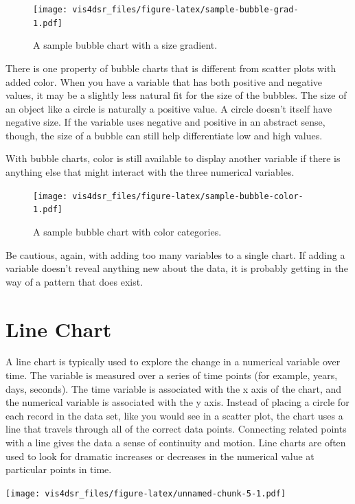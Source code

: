 \documentclass[
]{krantz}
\begin{document}
\begin{figure}
\centering
\texttt{[image: vis4dsr\_files/figure-latex/sample-bubble-grad-1.pdf]}
\caption{\label{fig:sample-bubble-grad}A sample bubble chart with a size gradient.}
\end{figure}

There is one property of bubble charts that is different from scatter plots with
added color. When you have a variable that has both positive and negative values,
it may be a slightly less natural fit for the size of the bubbles. The size of an
object like a circle is naturally a positive value. A circle doesn't itself have
negative size. If the variable uses negative and positive in an abstract sense,
though, the size of a bubble can still help differentiate low and high values.

With bubble charts, color is still available to display another variable if there
is anything else that might interact with the three numerical variables.

\begin{figure}
\centering
\texttt{[image: vis4dsr\_files/figure-latex/sample-bubble-color-1.pdf]}
\caption{\label{fig:sample-bubble-color}A sample bubble chart with color categories.}
\end{figure}

Be cautious, again, with adding too many variables to a single chart. If adding
a variable doesn't reveal anything new about the data, it is probably getting in the
way of a pattern that does exist.

\hypertarget{line-chart}{%
\section{Line Chart}\label{line-chart}}

A line chart is typically used to explore the change in a numerical variable over time.
The variable is measured over a series of time points (for example, years, days, seconds).
The time variable is associated with the x axis of the chart, and the numerical variable
is associated with the y axis. Instead of placing a circle for each record in the
data set, like you would see in a scatter plot, the chart uses a line that travels
through all of the correct data points. Connecting related points with a line
gives the data a sense of continuity and motion. Line charts are often used to look
for dramatic increases or decreases in the numerical value at particular points in time.

\texttt{[image: vis4dsr\_files/figure-latex/unnamed-chunk-5-1.pdf]}
\end{document}
